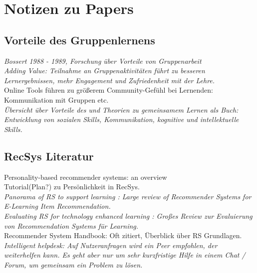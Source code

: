 \documentclass[nochapterpage,bigchapter,linedtoc,longdoc,colorback,accentcolor=tud3b]{tudreport}
\begin{document}
\chapter{Notizen zu Papers}

\section{Vorteile des Gruppenlernens}
\textit{Bossert 1988 - 1989, Forschung über Vorteile von Gruppenarbeit \cite{bossert1982instructional}}\\

\textit{Adding Value: Teilnahme an Gruppenaktivitäten führt zu besseren Lernergebnissen, mehr Engagement und Zufriedenheit mit der Lehre. \cite{zhao2004adding}}\\

Online Tools führen zu größerem Community-Gefühl bei Lernenden: Kommunikation mit Gruppen etc. \cite{dawson2006study}\\

\textit{Übersicht über Vorteile des und Theorien zu gemeinsamem Lernen als Buch: \cite{maxwell2008learning} Entwicklung von sozialen Skills, Kommunikation, kognitive und intellektuelle Skills.}

\section{RecSys Literatur}
Personality-based recommender systems: an overview \cite{nunes2012personality}\\
Tutorial(Plan?) zu Persönlichkeit in RecSys.\\

\textit{Panorama of RS to support learning \cite{drachsler2015panorama}: Large review of Recommender Systems for E-Learning Item Recommendation.}\\

\textit{Evaluating RS for technology enhanced learning \cite{erdt2015evaluating}: Großes Review zur Evaluierung von Recommendation Systems für Learning.}\\

Recommender System Handbook: \cite{ricci2011introduction} Oft zitiert, Überblick über RS Grundlagen.\\

\textit{Intelligent helpdesk: Auf Nutzeranfragen wird ein Peer empfohlen, der weiterhelfen kann. Es geht aber nur um sehr kurzfristige Hilfe in einem Chat / Forum, um gemeinsam ein Problem zu lösen. \cite{greer1998intelligent}}\\
\end{document}
